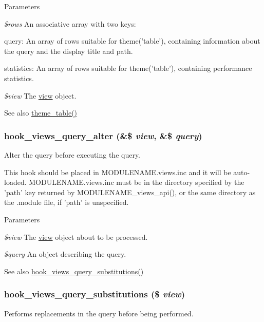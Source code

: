 \begin{DoxyParams}{Parameters}
\item[{\em \$rows}]An associative array with two keys:
\begin{DoxyItemize}
\item query: An array of rows suitable for theme('table'), containing information about the query and the display title and path.
\item statistics: An array of rows suitable for theme('table'), containing performance statistics. 
\end{DoxyItemize}\item[{\em \$view}]The \hyperlink{classview}{view} object. \end{DoxyParams}
\begin{DoxySeeAlso}{See also}
\hyperlink{group__themeable_ga9e35aa108c35f87b588197138a51823d}{theme\_\-table()} 
\end{DoxySeeAlso}
\hypertarget{group__views__hooks_gaf4d538493930fe0fa0ce6fb3bf42c156}{
\subsubsection[{hook\_\-views\_\-query\_\-alter}]{\setlength{\rightskip}{0pt plus 5cm}hook\_\-views\_\-query\_\-alter (\&\$ {\em view}, \/  \&\$ {\em query})}}
\label{group__views__hooks_gaf4d538493930fe0fa0ce6fb3bf42c156}
Alter the query before executing the query.

This hook should be placed in MODULENAME.views.inc and it will be auto-\/loaded. MODULENAME.views.inc must be in the directory specified by the 'path' key returned by MODULENAME\_\-views\_\-api(), or the same directory as the .module file, if 'path' is unspecified.


\begin{DoxyParams}{Parameters}
\item[{\em \$view}]The \hyperlink{classview}{view} object about to be processed. \item[{\em \$query}]An object describing the query. \end{DoxyParams}
\begin{DoxySeeAlso}{See also}
\hyperlink{group__views__hooks_gac3628ab1f08eee5a2bd9c3c4b5bd4c3b}{hook\_\-views\_\-query\_\-substitutions()} 
\end{DoxySeeAlso}
\hypertarget{group__views__hooks_gac3628ab1f08eee5a2bd9c3c4b5bd4c3b}{
\subsubsection[{hook\_\-views\_\-query\_\-substitutions}]{\setlength{\rightskip}{0pt plus 5cm}hook\_\-views\_\-query\_\-substitutions (\$ {\em view})}}
\label{group__views__hooks_gac3628ab1f08eee5a2bd9c3c4b5bd4c3b}
Performs replacements in the query before being performed.


